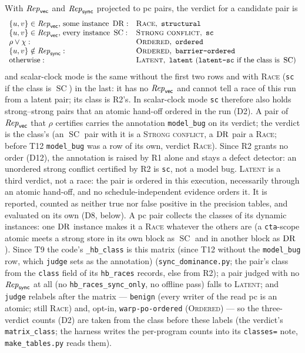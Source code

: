 \documentclass[11pt]{article}
\theoremstyle{remark}
\DeclareMathOperator{\SC}{SC}
\newcommand{\cls}[1]{\texttt{#1}}\newcommand{\M}{\mathsf{M}}
\begin{document}
With $\mathit{Rep}_{\mathsf{vec}}$ and $\mathit{Rep}_{\mathsf{sync}}$ projected
to pc pairs, the verdict for a candidate pair is
\[
\begin{array}{ll}
\{u,v\}\in\Rep_{\mathsf{vec}}\text{, some instance }\DR: & \textsc{Race},\ \cls{structural}\\
\{u,v\}\in\Rep_{\mathsf{vec}}\text{, every instance }\SC: & \textsc{Strong conflict},\ \cls{sc}\\
\rho\vee\chi: & \textsc{Ordered},\ \cls{ordered}\\
\{u,v\}\notin\Rep_{\mathsf{sync}}: & \textsc{Ordered},\ \cls{barrier-ordered}\\
\text{otherwise}: & \textsc{Latent},\ \cls{latent}\ (\cls{latent-sc}\text{ if the class is }\SC)
\end{array}
\]
and scalar-clock mode is the same without the first two rows and with \textsc{Race}
(\cls{sc} if the class is $\SC$) in the last: it has no $\mathit{Rep}_{\mathsf{vec}}$ and cannot tell a
race of this run from a latent pair; its class is R2's. In scalar-clock mode \cls{sc}
therefore also holds strong--strong pairs that an atomic hand-off ordered in the run (D2).
A pair of $\mathit{Rep}_{\mathsf{vec}}$ that $\rho$ certifies carries the annotation \cls{model\_bug} on
its verdict; the verdict is the class's (an $\SC$ pair with it is a \textsc{Strong conflict},
a $\operatorname{DR}$ pair a \textsc{Race}; before T12 \cls{model\_bug} was a row of its own, verdict
\textsc{Race}). Since R2 grants no order (D12), the annotation is raised by R1 alone and stays a
defect detector: an unordered strong conflict certified by R2 is \cls{sc}, not a model bug. \textsc{Latent}
is a third verdict, not a race: the pair is ordered in this execution, necessarily
through an atomic hand-off, and no schedule-independent evidence orders it. It is
reported, counted as neither true nor false positive in the precision tables, and
evaluated on its own (D8, below). A pc pair collects the classes of its dynamic instances:
one $\operatorname{DR}$ instance makes it a \textsc{Race} whatever the others are (a \texttt{cta}-scope
atomic meets a strong store in its own block as $\SC$ and in another block as $\operatorname{DR}$). Since
T9 the code's \texttt{\_hb\_class} is this matrix (since T12 without the \cls{model\_bug} row,
which \texttt{judge} sets as the annotation) (\texttt{sync\_dominance.py}; the pair's
class from the \texttt{class} field of its \texttt{hb\_races} records, else from R2); a
pair judged with no $\mathit{Rep}_{\mathsf{sync}}$ at all (no \texttt{hb\_races\_sync\_only}, no
offline pass) falls to \textsc{Latent}; and \texttt{judge} relabels after the matrix ---
\cls{benign} (every writer of the read pc is an atomic; still \textsc{Race}) and, opt-in,
\cls{warp-po-ordered} (\textsc{Ordered}) --- so the three-verdict counts (D2) are taken from
the class before these labels (the verdict's \texttt{matrix\_class}; the harness writes the
per-program counts into its \texttt{classes=} note, \texttt{make\_tables.py} reads them).
\end{document}
